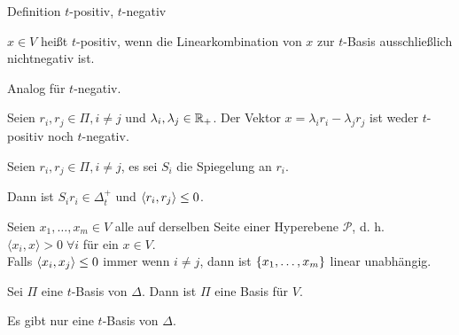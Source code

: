 \documentclass{beamer}
\begin{document}
\begin{frame}{Definition \(t\)-positiv, \( t \)-negativ}
    \begin{defi}
        \( x \in V \) heißt \(t\)-positiv, wenn 
        die Linearkombination von \(x\) zur 
        \(t\)-Basis ausschließlich nichtnegativ ist.

        Analog für \( t \)-negativ.
    \end{defi}
    \pause
    \begin{satz} %
        Seien \( r_i, r_j \in \Pi, i \neq j \) und 
        \( \lambda_i, \lambda_j \in \mathbb{R}_+ \). 
        Der Vektor \( x = \lambda_i r_i - \lambda_j r_j \) 
        ist weder \( t \)-positiv noch \( t \)-negativ.
    \end{satz}
\end{frame}

\begin{frame}
    \begin{satz} %
        
        Seien \( r_i, r_j \in \Pi, i \neq j \), es 
        sei \( S_i \) die Spiegelung an \( r_i \). 

        Dann ist \( S_i r_i \in \Delta_t^+ \) und 
        \( \langle r_i, r_j \rangle \leq 0 \).
    \end{satz}\pause

    \begin{satz} %
        Seien \( x_1, \ldots, x_m \in V \) alle auf derselben 
        Seite einer Hyperebene \( \mathscr{P} \), 
        d. h. \( \langle x_i, x \rangle > 0 \;\forall i \) für 
        ein \( x\in V \). \\
        Falls \( \langle x_i, x_j \rangle \leq 0 \) immer wenn 
        \( i \neq j \), dann ist \( \{x_1, \ldots, x_m\} \) 
        linear unabhängig.
    \end{satz}
\end{frame}

\begin{frame}
    \begin{satz} %
        Sei \( \Pi \) eine \(t\)-Basis von \( \Delta \). Dann ist 
        \( \Pi \) eine Basis für \( V \).
    \end{satz}\pause
    \begin{satz} %
        Es gibt nur eine \( t \)-Basis von \( \Delta \).
    \end{satz}
\end{frame}
\end{document}
